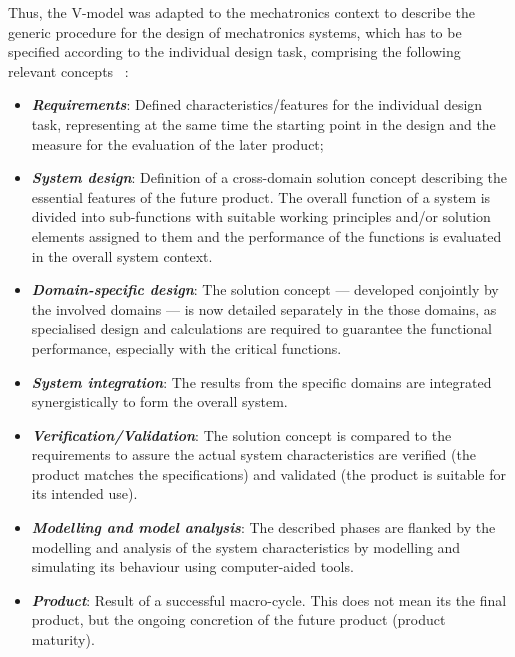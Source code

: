 Thus, the V-model was adapted to the mechatronics context to describe the
generic procedure for the design of mechatronics systems, which has to be
specified according to the individual design task, comprising the following
relevant concepts
~\cite{gausemeier2003new}:
\begin{itemize}
  \item \textbf{\emph{Requirements}}: Defined characteristics/features for the
    individual design task, representing at the same time the starting point in
    the design and the measure for the evaluation of the later product;
  \item \textbf{\emph{System design}}: Definition of a cross-domain solution
    concept describing the essential features of the future product. The overall
    function of a system is divided into sub-functions with suitable working
    principles and/or solution elements assigned to them and the performance of
    the functions is evaluated in the overall system context.
  \item \textbf{\emph{Domain-specific design}}: The solution concept --- developed
    conjointly by the involved domains --- is now detailed separately in the those
    domains, as specialised design and calculations are required to guarantee
    the functional performance, especially with the critical functions. 
  \item \textbf{\emph{System integration}}: The results from the specific domains
    are integrated synergistically to form the overall system.
  \item \textbf{\emph{Verification/Validation}}: The solution concept is
    compared to the requirements to assure the actual system characteristics are
    verified (the product matches the specifications) and validated (the
    product is suitable for its intended use).
  \item \textbf{\emph{Modelling and model analysis}}: The described phases are
    flanked by the modelling and analysis of the system characteristics by
    modelling and simulating its behaviour using computer-aided tools.
  \item \textbf{\emph{Product}}: Result of a successful macro-cycle. This does
    not mean its the final product, but the ongoing concretion of the future
    product (product maturity).
\end{itemize}

